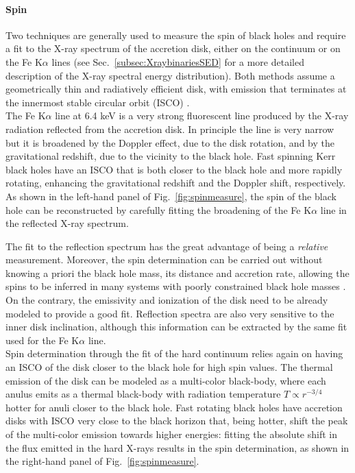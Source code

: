 \documentclass[a4paper,titlepage]{book}     	%
\begin{document}
\paragraph{Spin}
Two techniques are generally used to measure the spin of black holes and require a fit to the X-ray spectrum of the accretion disk, either on the continuum or on the Fe K$\alpha$ lines (see Sec.\ \ref{subsec:XraybinariesSED} for a more detailed description of the X-ray spectral energy distribution). Both methods assume a geometrically thin and radiatively efficient disk, with emission that terminates at the innermost stable circular orbit (ISCO) \cite{Xbinaries_spinBHmeasure}.\\

The Fe K$\alpha$ line at 6.4 keV is a very strong fluorescent line produced by the X-ray radiation reflected from the accretion disk. In principle the line is very narrow but it is broadened by the Doppler effect, due to the disk rotation, and by the gravitational redshift, due to the vicinity to the black hole. Fast spinning Kerr black holes have an ISCO that is both closer to the black hole and more rapidly rotating, enhancing the gravitational redshift and the Doppler shift, respectively. As shown in the left-hand panel of Fig.\ \ref{fig:spinmeasure}, the spin of the black hole can be reconstructed by carefully fitting the broadening of the Fe K$\alpha$ line in the reflected X-ray spectrum.

The fit to the reflection spectrum has the great advantage of being a \textit{relative} measurement. Moreover, the spin determination can be carried out without knowing a priori the black hole mass, its distance and accretion rate, allowing the spins to be inferred in many systems with poorly constrained black hole masses \cite{HMXBH_spins2021}. On the contrary, the emissivity and ionization of the disk need to be already modeled to provide a good fit. Reflection spectra are also very sensitive to the inner disk inclination, although this information can be extracted by the same fit used for the Fe K$\alpha$ line.\\

Spin determination through the fit of the hard continuum relies again on having an ISCO of the disk closer to the black hole for high spin values. The thermal emission of the disk can be modeled as a multi-color black-body, where each anulus emits as a thermal black-body with radiation temperature $T \propto r^{-3/4}$ hotter for anuli closer to the black hole. Fast rotating black holes have accretion disks with ISCO very close to the black horizon that, being hotter, shift the peak of the multi-color emission towards higher energies: fitting the absolute shift in the flux emitted in the hard X-rays results in the spin determination, as shown in the right-hand panel of Fig.\ \ref{fig:spinmeasure}.
\end{document}
